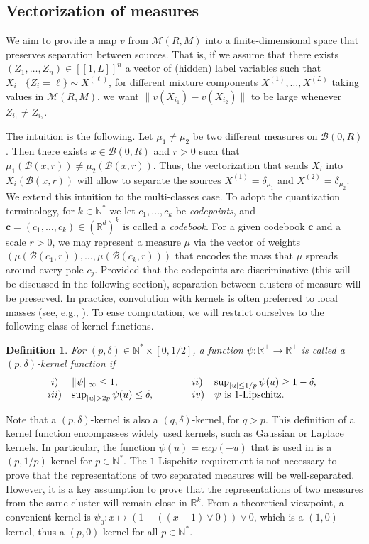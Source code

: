 \documentclass[noinfoline,preprint]{article}
\newtheorem{defi}[theorem]{Definition}
\newcommand{\cb}{\mathbf{c}}
\newcommand{\R}{\mathbb{R}}
\renewcommand{\1}{\mathds 1}
\newcommand{\B}{\mathcal{B}}
\begin{document}
\subsection{Vectorization of measures}\label{sec:vectorization}

We aim to provide a map $v$ from $\mathcal{M}(R,M)$ into a finite-dimensional space that preserves separation between sources. That is, if we assume that there exists $(Z_1, \hdots, Z_n) \in [\![1,L]\!]^n$ a vector of (hidden) label variables such that $X_i \mid \{Z_i = \ell \} \sim X^{(\ell)}$, for different mixture components $X^{(1)}, \hdots, X^{(L)}$ taking values  in $\mathcal{M}(R,M)$, we want $\|v(X_{i_1}) - v(X_{i_2})\|$ to be large whenever $Z_{i_1} \neq Z_{i_2}$. 

    The intuition is the following. Let $\mu_1 \neq \mu_2$ be two different measures on $\B(0,R)$. Then there exists $x \in \B(0,R)$ and $r>0$ such that $\mu_1(\B(x,r)) \neq \mu_2(\B(x,r))$. Thus, the vectorization that sends $X_i$ into $X_i(\B(x,r))$ will allow to separate the sources $X^{(1)} = \delta_{\mu_1}$ and $X^{(2)} = \delta_{\mu_2}$. We extend this intuition to the multi-classes case. To adopt the quantization terminology, for $k \in \mathbb{N}^*$ we let $c_1, \hdots, c_k$ be \textit{codepoints}, and $\cb = (c_1, \hdots, c_k) \in (\R^d)^k$ is called a \textit{codebook}. For a given codebook $\cb$ and a scale $r>0$, we may represent a measure $\mu$ via the vector of weights $(\mu(\B(c_1,r)), \hdots,\mu(\B(c_k,r)))$ that encodes the mass that $\mu$ spreads around every pole $c_j$. Provided that the codepoints are discriminative (this will be discussed in the following section), separation between clusters of measure will be preserved. In practice, convolution with kernels is often preferred to local masses (see, e.g., \cite{Royer19}). To ease computation, we will restrict ourselves to the following class of kernel functions. 
\begin{defi}\label{def:kernel_functions}
For $(p,\delta) \in \mathbb{N}^*\times [0,1/2]$, a function $\psi: \mathbb{R}^+ \rightarrow \mathbb{R}^+$ is called a $(p,\delta)$-kernel function if
\[
\begin{array}{@{}clcll}
i)& \|\psi\|_\infty \leq 1, & \qquad & ii)& \sup_{|u| \leq 1/p} \psi(u) \geq 1- \delta, \\
iii) &  \sup_{|u| >2p} \psi(u) \leq \delta, & \qquad & iv)& \mbox{$\psi$ is $1$-Lipschitz}.
\end{array}
\]
\end{defi}
Note that a $(p,\delta)$-kernel is also a $(q,\delta)$-kernel, for $q >p$. This definition of a kernel function encompasses widely used kernels, such as Gaussian or Laplace kernels. In particular, the function $\psi(u) = exp(-u)$ that is used in \cite{Royer19} is a  $(p,1/p)$-kernel for $p \in \mathbb{N}^*$. The $1$-Lispchitz requirement is not necessary to prove that the representations of two separated measures will be well-separated. However, it is a key assumption to prove that the representations of two measures from the same cluster will remain close in $\R^k$. From a theoretical viewpoint, a convenient kernel is $\psi_0:x \mapsto (1- ((x-1) \vee 0)) \vee 0$, which is a $(1,0)$-kernel, thus a $(p,0)$-kernel for all $p \in \mathbb{N}^*$. 
\end{document}
